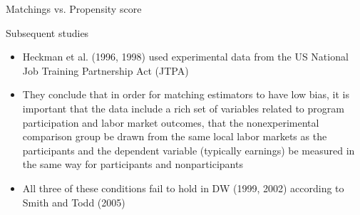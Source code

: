 \documentclass{beamer}
\begin{document}
\begin{frame}{Matchings vs. Propensity score}
	
	\begin{figure}
	\end{figure}



\end{frame}


\clearpage
\newpage

\begin{frame}{Subsequent studies}

\begin{itemize}
\item Heckman et al. (1996, 1998) used experimental data from the US National Job Training Partnership Act (JTPA)
\item They conclude that in order for matching estimators to have low bias, it is important that the data include a rich set of variables related to program participation and labor market outcomes, that the nonexperimental comparison group be drawn from the same local labor markets as the participants and the dependent variable (typically earnings) be measured in the same way for participants and nonparticipants
\item All three of these conditions fail to hold in DW (1999, 2002) according to Smith and Todd (2005)
\end{itemize}

\end{frame}
\end{document}
